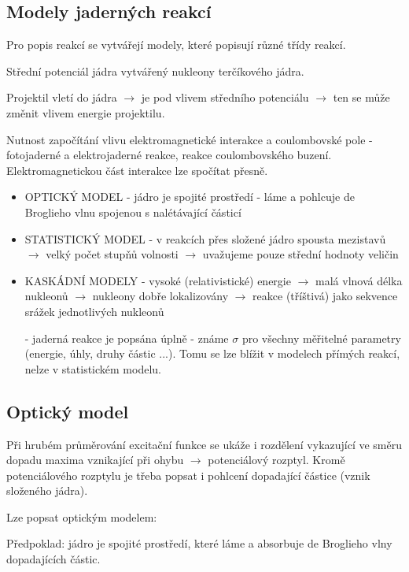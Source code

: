 \documentclass[../../main.tex]{subfiles}
\begin{document}
\subsection{Modely jaderných reakcí}

Pro popis reakcí se vytvářejí modely, které popisují různé třídy reakcí. 

Střední potenciál jádra vytvářený nukleony terčíkového jádra. 

Projektil vletí do jádra $\rightarrow$ je pod vlivem středního potenciálu $\rightarrow$ ten se může změnit vlivem energie projektilu.

Nutnost započítání vlivu elektromagnetické interakce a coulombovské pole - fotojaderné a elektrojaderné reakce, reakce coulombovského  buzení. Elektromagnetickou část interakce lze spočítat přesně. 
 
\begin{itemize}
	\item OPTICKÝ MODEL - jádro je spojité prostředí - láme a pohlcuje de Broglieho vlnu spojenou s nalétávající částicí
	\item STATISTICKÝ MODEL - v reakcích přes složené jádro spousta mezistavů $\rightarrow$ velký počet stupňů volnosti $\rightarrow$ uvažujeme pouze střední hodnoty veličin
	\item KASKÁDNÍ MODELY - vysoké (relativistické) energie $\rightarrow$ malá vlnová délka nukleonů $\rightarrow$ nukleony dobře lokalizovány $\rightarrow$ reakce (tříštivá) jako sekvence srážek jednotlivých nukleonů
	
- jaderná reakce je popsána úplně - známe $\sigma$ pro všechny měřitelné parametry (energie, úhly, druhy částic ...). Tomu se lze blížit v modelech přímých reakcí, nelze v statistickém modelu.	
\end{itemize}

\subsection{Optický model}

Při hrubém průměrování excitační funkce se ukáže i rozdělení vykazující ve směru dopadu maxima vznikající při ohybu $\rightarrow$ potenciálový rozptyl. Kromě potenciálového rozptylu je třeba popsat i pohlcení dopadající částice (vznik složeného jádra).

Lze popsat optickým modelem:

Předpoklad: jádro je spojité prostředí, které láme a absorbuje de Broglieho vlny dopadajících částic.
\end{document}
